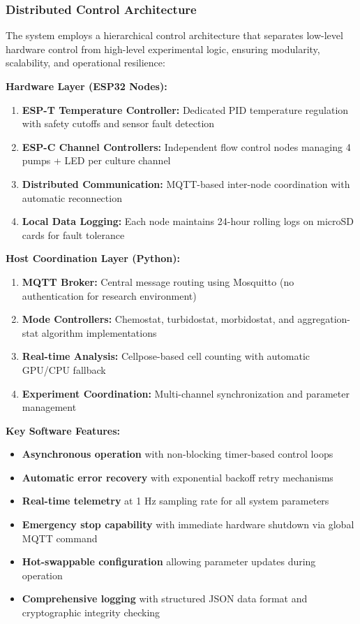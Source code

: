 \subsubsection{Distributed Control Architecture}

The system employs a hierarchical control architecture that separates low-level hardware control from high-level experimental logic, ensuring modularity, scalability, and operational resilience:

\textbf{Hardware Layer (ESP32 Nodes):}
\begin{enumerate}
\item \textbf{ESP-T Temperature Controller:} Dedicated PID temperature regulation with safety cutoffs and sensor fault detection
\item \textbf{ESP-C Channel Controllers:} Independent flow control nodes managing 4 pumps + LED per culture channel
\item \textbf{Distributed Communication:} MQTT-based inter-node coordination with automatic reconnection
\item \textbf{Local Data Logging:} Each node maintains 24-hour rolling logs on microSD cards for fault tolerance
\end{enumerate}

\textbf{Host Coordination Layer (Python):}
\begin{enumerate}
\item \textbf{MQTT Broker:} Central message routing using Mosquitto (no authentication for research environment)
\item \textbf{Mode Controllers:} Chemostat, turbidostat, morbidostat, and aggregation-stat algorithm implementations
\item \textbf{Real-time Analysis:} Cellpose-based cell counting with automatic GPU/CPU fallback
\item \textbf{Experiment Coordination:} Multi-channel synchronization and parameter management
\end{enumerate}

\textbf{Key Software Features:}
\begin{itemize}
\item \textbf{Asynchronous operation} with non-blocking timer-based control loops
\item \textbf{Automatic error recovery} with exponential backoff retry mechanisms  
\item \textbf{Real-time telemetry} at 1 Hz sampling rate for all system parameters
\item \textbf{Emergency stop capability} with immediate hardware shutdown via global MQTT command
\item \textbf{Hot-swappable configuration} allowing parameter updates during operation
\item \textbf{Comprehensive logging} with structured JSON data format and cryptographic integrity checking
\end{itemize}


